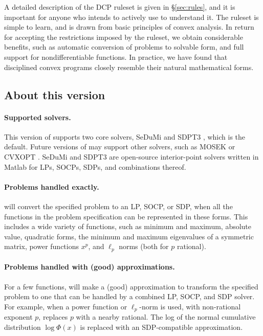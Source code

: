 \documentclass[12pt]{article}
\begin{document}
A detailed description of the DCP ruleset is given in \S\ref{sec:rules},
and it is important for anyone who intends to actively use
\cvx to understand it.
The ruleset is simple 
to learn, and is drawn from basic principles of convex analysis.
In return for accepting the restrictions imposed by the ruleset,
we obtain considerable benefits, such as automatic conversion of
problems to solvable form, and full support for nondifferentiable 
functions. 
In practice, we have found that
disciplined convex programs closely resemble
their natural mathematical forms.

\subsection{About this version}
\label{sec:version}
\paragraph{Supported solvers.}
This version of \cvx supports two core solvers, SeDuMi
\cite{Stu:99} and SDPT3 \cite{SDPT3}, which is the default.
Future versions of \cvx may support other solvers, such as
MOSEK \cite{MOSEK} or CVXOPT \cite{CVXOPT}.
SeDuMi and SDPT3 are open-source interior-point solvers written in Matlab for 
LPs, SOCPs, SDPs, and combinations thereof.

\paragraph{Problems handled exactly.}
\cvx will convert the specified problem to an LP, SOCP, or SDP,
when all the functions in the problem specification can be
represented in these forms.
This includes a wide variety of functions, such as minimum and
maximum, absolute value, quadratic forms, 
the minimum and maximum eigenvalues of a symmetric matrix,
power functions $x^p$, and $\ell_p$ norms (both for $p$ rational).

\paragraph{Problems handled with (good) approximations.}
For a few functions, \cvx will make a (good) approximation to transform the
specified problem to one that can be handled by a combined 
LP, SOCP, and SDP solver.
For example, when a power function or $\ell_p$-norm is used, with 
non-rational exponent $p$, \cvx replaces $p$ with a nearby rational.
The log of the normal cumulative distribution $\log \Phi(x)$ is
replaced with an SDP-compatible approximation.
\end{document}
